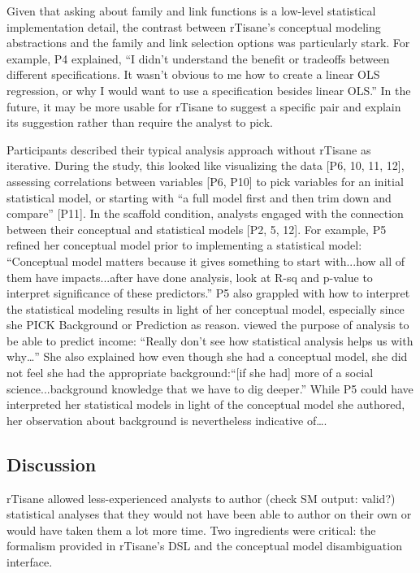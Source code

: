 Given that asking about family and link functions is a low-level statistical
implementation detail, the contrast between rTisane’s conceptual modeling
abstractions and the family and link selection options was particularly stark.
For example, P4 explained, ``I didn't understand the benefit or tradeoffs
between different specifications. It wasn't obvious to me how to create a linear
OLS regression, or why I would want to use a specification besides linear OLS.''
In the future, it may be more usable for rTisane to suggest a specific pair and
explain its suggestion rather than require the analyst to pick.

Participants described their typical analysis approach without rTisane as
iterative. During the study, this looked like visualizing the data [P6, 10,
11, 12], assessing correlations between variables [P6, P10] to pick variables
for an initial statistical model, or starting with ``a full model first and
then trim down and compare'' [P11]. In the scaffold condition, analysts engaged
with the connection between their conceptual and statistical models [P2, 5,
12]. For example, P5 refined her conceptual model prior to implementing a
statistical model: ``Conceptual model matters because it gives something to
start with...how all of them have impacts...after have done analysis, look at
R-sq and p-value to interpret significance of these predictors.'' P5 also
grappled with how to interpret the statistical modeling results in light of her
conceptual model, especially since she PICK Background or Prediction as reason.
viewed the purpose of analysis to be able to predict income: ``Really don’t see
how statistical analysis helps us with why…'' She also explained how even though
she had a conceptual model, she did not feel she had the appropriate
background:``[if she had] more of a social science...background knowledge that
we have to dig deeper.'' While P5 could have interpreted her statistical models
in light of the conceptual model she authored, her observation about background
is nevertheless indicative of….


\subsection{Discussion}
rTisane allowed less-experienced analysts to author (check SM output: valid?)
statistical analyses that they would not have been able to author on their own
or would have taken them a lot more time. Two ingredients were critical: the
formalism provided in rTisane’s DSL and the conceptual model disambiguation
interface.

